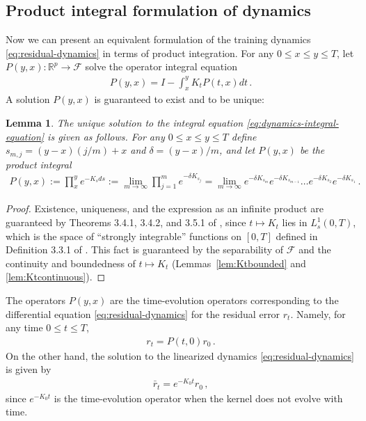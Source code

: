 \documentclass[11pt]{article} %
\newcommand{\R}{\mathbb{R}}
\newcommand{\<}{\langle}
\renewcommand{\>}{\rangle}
\def\cF{{\mathcal F}}
\def\cF{{\mathcal F}}
\theoremstyle{plain}
\newtheorem{lemma}[theorem]{Lemma}
\theoremstyle{definition}
\theoremstyle{remark}
\begin{document}
\subsection{Product integral formulation of dynamics}
Now we can present an equivalent formulation of the training dynamics \eqref{eq:residual-dynamics} in terms of product integration. For any $0 \leq x \leq y \leq T$, let $P(y,x) : \R^p \to \cF$ solve the operator integral equation
\begin{align}\label{eq:dynamics-integral-equation}
P(y,x) = I - \int_{x}^y K_t P(t,x) dt\,.
\end{align}
A solution $P(y,x)$ is guaranteed to exist and to be unique:
\begin{lemma}\label{lem:product-integral-formulation-of-dynamics}
The unique solution to the integral equation \eqref{eq:dynamics-integral-equation} is given as follows. For any $0 \leq x \leq y \leq T$ define $s_{m,j} = (y-x)(j/m) + x$ and $\delta = (y-x) / m$, and let $P(y,x)$ be the product integral 
\begin{align*}
P(y,x) := \prod_{x}^y e^{-K_s ds} := \lim_{m \to \infty} \prod_{j=1}^m e^{-\delta K_{s_j}} = \lim_{m \to \infty} e^{-\delta K_{s_m}} e^{-\delta K_{s_{m-1}}} \dots e^{-\delta K_{s_2}} e^{-\delta K_{s_1}}\,.
\end{align*}
\end{lemma}
\begin{proof}
Existence, uniqueness, and the expression as an infinite product are guaranteed by Theorems 3.4.1, 3.4.2, and 3.5.1 of \cite{dollard_friedman_1984}, since $t \mapsto K_t$ lies in $L_s^1(0,T)$, which is the space of ``strongly integrable'' functions on $[0,T]$ defined in Definition 3.3.1 of \cite{dollard_friedman_1984}. This fact is guaranteed by the separability of $\cF$ and the continuity and boundedness of $t \mapsto K_t$ (Lemmas~\ref{lem:Ktbounded} and \ref{lem:Ktcontinuous}).
\end{proof}

The operators $P(y,x)$ are the time-evolution operators corresponding to the differential equation \eqref{eq:residual-dynamics} for the residual error $r_t$. Namely, for any time $0 \leq t \leq T$,
\begin{align*}
r_t = P(t,0) r_0\,.
\end{align*}
On the other hand, the solution to the linearized dynamics \eqref{eq:residual-dynamics} is given by
\begin{align*}
\bar{r}_t = e^{-K_0 t} r_0\,,
\end{align*}
since $e^{-K_0 t}$ is the time-evolution operator when the kernel does not evolve with time.
\end{document}
